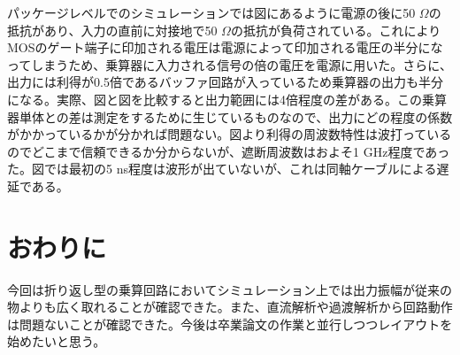 \documentclass[twocolumn]{jsarticle}
\begin{document}
    パッケージレベルでのシミュレーションでは図にあるように電源の後に50 $\Omega$の抵抗があり、入力の直前に対接地で50 $\Omega$の抵抗が負荷されている。これによりMOSのゲート端子に印加される電圧は電源によって印加される電圧の半分になってしまうため、乗算器に入力される信号の倍の電圧を電源に用いた。さらに、出力には利得が0.5倍であるバッファ回路が入っているため乗算器の出力も半分になる。実際、図と図を比較すると出力範囲には4倍程度の差がある。この乗算器単体との差は測定をするために生じているものなので、出力にどの程度の係数がかかっているかが分かれば問題ない。図より利得の周波数特性は波打っているのでどこまで信頼できるか分からないが、遮断周波数はおよそ1 GHz程度であった。図では最初の5 ns程度は波形が出ていないが、これは同軸ケーブルによる遅延である。

\section{おわりに}
    今回は折り返し型の乗算回路においてシミュレーション上では出力振幅が従来の物よりも広く取れることが確認できた。また、直流解析や過渡解析から回路動作は問題ないことが確認できた。今後は卒業論文の作業と並行しつつレイアウトを始めたいと思う。
\end{document}
